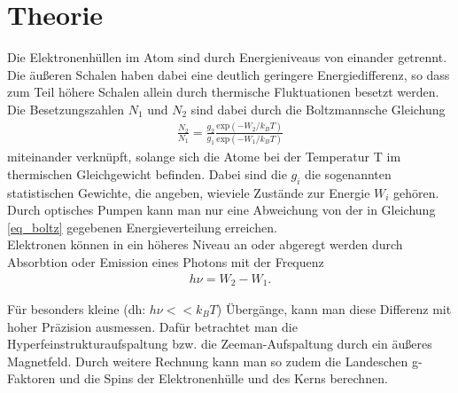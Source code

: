 

\section{Theorie}
\setcounter{page}{1}
Die Elektronenhüllen im Atom sind durch Energieniveaus von einander getrennt. Die äußeren Schalen haben dabei eine deutlich geringere Energiedifferenz, so dass zum Teil höhere Schalen allein durch thermische Fluktuationen besetzt werden. Die Besetzungszahlen $N_1$ und $N_2$ sind dabei durch die Boltzmannsche Gleichung
\begin{align}
\frac{N_2}{N_1}=\frac{g_2}{g_1}\frac{\text{exp}(-W_2/k_BT)}{\text{exp}(-W_1/k_BT)}
\label{eq_boltz}
\end{align}
miteinander verknüpft, solange sich die Atome bei der Temperatur T im thermischen Gleichgewicht befinden. Dabei sind die $g_i$ die sogenannten statistischen Gewichte, die angeben, wieviele Zustände zur Energie $W_i$ gehören.\\

Durch optisches Pumpen kann man nur eine Abweichung von der in Gleichung \eqref{eq_boltz} gegebenen Energieverteilung erreichen.\\
Elektronen können in ein höheres Niveau an oder abgeregt werden durch Absorbtion oder Emission eines Photons mit der Frequenz
\begin{align}
h\nu=W_2-W_1
\label{eq_quant} .
\end{align}

Für besonders kleine (dh: $h\nu << k_B T$) Übergänge, kann man diese Differenz mit hoher Präzision ausmessen. Dafür betrachtet man die Hyperfeinstrukturaufspaltung bzw. die Zeeman-Aufspaltung durch ein äußeres Magnetfeld. Durch weitere Rechnung kann man so zudem die Landeschen g-Faktoren und die Spins der Elektronenhülle und des Kerns berechnen.\\

